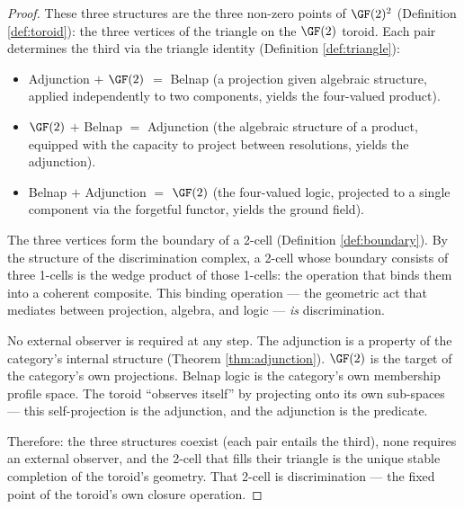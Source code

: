 \begin{proof}
These three structures are the three non-zero points of
$\GF(2)^2$ (Definition \ref{def:toroid}): the three
vertices of the triangle on the $\GF(2)$ toroid. Each
pair determines the third via the triangle identity
(Definition \ref{def:triangle}):
\begin{itemize}[nosep]
  \item Adjunction $+$ $\GF(2)$ $=$ Belnap
    (a projection given algebraic structure, applied
    independently to two components, yields the
    four-valued product).
  \item $\GF(2)$ $+$ Belnap $=$ Adjunction
    (the algebraic structure of a product, equipped
    with the capacity to project between resolutions,
    yields the adjunction).
  \item Belnap $+$ Adjunction $=$ $\GF(2)$
    (the four-valued logic, projected to a single
    component via the forgetful functor, yields the
    ground field).
\end{itemize}

The three vertices form the boundary of a 2-cell
(Definition \ref{def:boundary}). By the structure of the
discrimination complex, a 2-cell whose boundary consists
of three 1-cells is the wedge product of those 1-cells:
the operation that binds them into a coherent composite.
This binding operation --- the geometric act that mediates
between projection, algebra, and logic --- \emph{is}
discrimination.

No external observer is required at any step. The
adjunction is a property of the category's internal
structure (Theorem \ref{thm:adjunction}). $\GF(2)$ is the
target of the category's own projections. Belnap logic is
the category's own membership profile space. The toroid
``observes itself'' by projecting onto its own sub-spaces
--- this self-projection is the adjunction, and the
adjunction is the predicate.

Therefore: the three structures coexist (each pair entails
the third), none requires an external observer, and the
2-cell that fills their triangle is the unique stable
completion of the toroid's geometry.
That 2-cell is discrimination --- the fixed point of the
toroid's own closure operation.
\end{proof}

